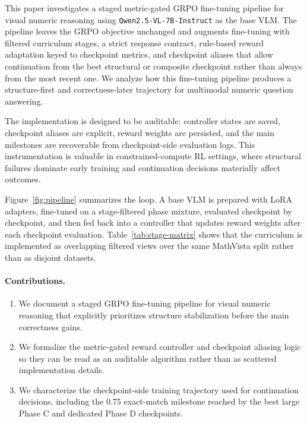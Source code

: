 \documentclass{article} %
\begin{document}
This paper investigates a staged metric-gated GRPO fine-tuning pipeline for visual numeric reasoning using \texttt{Qwen2.5-VL-7B-Instruct} as the base VLM. The pipeline leaves the GRPO objective unchanged and augments fine-tuning with filtered curriculum stages, a strict response contract, rule-based reward adaptation keyed to checkpoint metrics, and checkpoint aliases that allow continuation from the best structural or composite checkpoint rather than always from the most recent one. We analyze how this fine-tuning pipeline produces a structure-first and correctness-later trajectory for multimodal numeric question answering.

The implementation is designed to be auditable: controller states are saved, checkpoint aliases are explicit, reward weights are persisted, and the main milestones are recoverable from checkpoint-side evaluation logs. This instrumentation is valuable in constrained-compute RL settings, where structural failures dominate early training and continuation decisions materially affect outcomes.

Figure~\ref{fig:pipeline} summarizes the loop. A base VLM is prepared with LoRA adapters, fine-tuned on a stage-filtered phase mixture, evaluated checkpoint by checkpoint, and then fed back into a controller that updates reward weights after each checkpoint evaluation. Table~\ref{tab:stage-matrix} shows that the curriculum is implemented as overlapping filtered views over the same MathVista split rather than as disjoint datasets.

\paragraph{Contributions.}
\begin{enumerate}[leftmargin=1.2em]
\item We document a staged GRPO fine-tuning pipeline for visual numeric reasoning that explicitly prioritizes structure stabilization before the main correctness gains.
\item We formalize the metric-gated reward controller and checkpoint aliasing logic so they can be read as an auditable algorithm rather than as scattered implementation details.
\item We characterize the checkpoint-side training trajectory used for continuation decisions, including the 0.75 exact-match milestone reached by the best large Phase C and dedicated Phase D checkpoints.
\end{enumerate}
\end{document}
